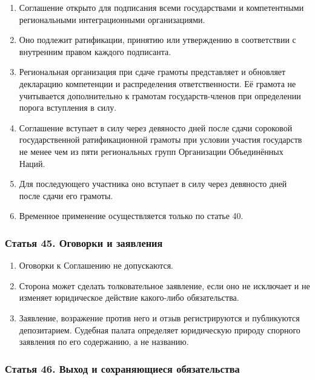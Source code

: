 \documentclass[
  russian,
  11pt,
  a4paper,
]{article}
\providecommand{\tightlist}{%
  \setlength{\itemsep}{0pt}\setlength{\parskip}{0pt}}
\begin{document}
\begin{enumerate}
\def\labelenumi{\arabic{enumi}.}
\tightlist
\item
  Соглашение открыто для подписания всеми государствами и компетентными
  региональными интеграционными организациями.
\item
  Оно подлежит ратификации, принятию или утверждению в соответствии с
  внутренним правом каждого подписанта.
\item
  Региональная организация при сдаче грамоты представляет и обновляет
  декларацию компетенции и распределения ответственности. Её грамота не
  учитывается дополнительно к грамотам государств-членов при определении
  порога вступления в силу.
\item
  Соглашение вступает в силу через девяносто дней после сдачи сороковой
  государственной ратификационной грамоты при условии участия государств
  не менее чем из пяти региональных групп Организации Объединённых
  Наций.
\item
  Для последующего участника оно вступает в силу через девяносто дней
  после сдачи его грамоты.
\item
  Временное применение осуществляется только по статье 40.
\end{enumerate}

\subsubsection{Статья 45. Оговорки и
заявления}\label{ux441ux442ux430ux442ux44cux44f-45-ux43eux433ux43eux432ux43eux440ux43aux438-ux438-ux437ux430ux44fux432ux43bux435ux43dux438ux44f}

\begin{enumerate}
\def\labelenumi{\arabic{enumi}.}
\tightlist
\item
  Оговорки к Соглашению не допускаются.
\item
  Сторона может сделать толковательное заявление, если оно не исключает
  и не изменяет юридическое действие какого-либо обязательства.
\item
  Заявление, возражение против него и отзыв регистрируются и публикуются
  депозитарием. Судебная палата определяет юридическую природу спорного
  заявления по его содержанию, а не названию.
\end{enumerate}

\subsubsection{Статья 46. Выход и сохраняющиеся
обязательства}\label{ux441ux442ux430ux442ux44cux44f-46-ux432ux44bux445ux43eux434-ux438-ux441ux43eux445ux440ux430ux43dux44fux44eux449ux438ux435ux441ux44f-ux43eux431ux44fux437ux430ux442ux435ux43bux44cux441ux442ux432ux430}
\end{document}
